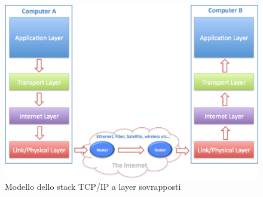 \begin{figure}[H]
  \centering
  \includegraphics[width=0.95\linewidth, keepaspectratio]{tcpip}
  \caption{Modello dello stack TCP/IP a layer sovrapposti}
  \label{fig:tcpip}
\end{figure}

